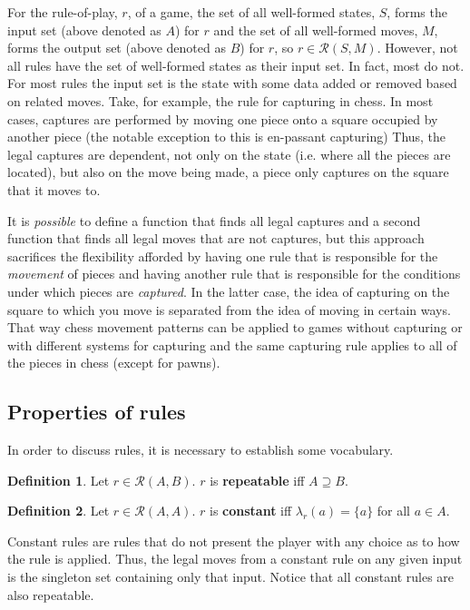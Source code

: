 \documentclass{article}
\theoremstyle{definition}
\newtheorem{definition}{Definition}[subsection]
\theoremstyle{plain}
\def\rule{\mathcal{R}}
\begin{document}
For the rule-of-play, $ r $, of a game,
the set of all well-formed states, $ S $, forms the input set (above denoted as $ A $) for $ r $
and the set of all well-formed moves, $ M $, forms the output set (above denoted as $ B $) for $ r $,
so $ r \in \rule (S, M) $.
However, not all rules have the set of well-formed states as their input set.
In fact, most do not.
For most rules the input set is the state with some data added or removed based on related moves.
Take, for example, the rule for capturing in chess.
In most cases, captures are performed by moving one piece onto a square occupied by another piece
(the notable exception to this is en-passant capturing)
Thus, the legal captures are dependent, not only on the state (i.e. where all the pieces are located),
but also on the move being made, a piece only captures on the square that it moves to.

It is \emph{possible} to define a function that finds all legal captures
and a second function that finds all legal moves that are not captures,
but this approach sacrifices the flexibility afforded by having
one rule that is responsible for the \emph{movement} of pieces
and having another rule that is responsible for the conditions under which pieces are \emph{captured}.
In the latter case, the idea of capturing on the square to which you move is separated from the idea of moving in certain ways.
That way chess movement patterns can be applied to games without capturing or with different systems for capturing
and the same capturing rule applies to all of the pieces in chess (except for pawns).

\subsection{Properties of rules} %

In order to discuss rules,
it is necessary to establish some vocabulary.

\begin{definition} 
  Let $ r \in \rule (A, B) $. $ r $ is \textbf{repeatable} iff $ A \supseteq B $.
\end{definition}

\begin{definition}
  Let $ r \in \rule (A, A) $. $ r $ is \textbf{constant} iff $ \lambda_r (a) = \{ a \} $ for all $ a \in A $.
\end{definition}

Constant rules are rules that do not present the player with any choice as to how the rule is applied.
Thus, the legal moves from a constant rule on any given input is the singleton set containing only that input.
Notice that all constant rules are also repeatable.
\end{document}
